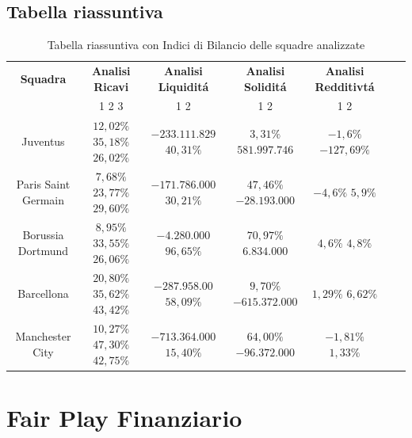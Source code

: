 \documentclass[
    corpo=12pt,
    oneside,
    evenboxes,
    tipotesi=triennale,
    stile=classica,
    oldstyle,
    autoretitolo,
    greek,
]{toptesi}
\begin{document}
\begin{interlinea}{1.5}
\section{Tabella riassuntiva}
\begin{table}
    \scriptsize
    \caption{Tabella riassuntiva con Indici di Bilancio delle squadre analizzate}
    \label{tabella_riassunto_cap1}
    \begin{tabular}{ccccccc}
        \toprule
        \textbf{Squadra} & \textbf{Analisi Ricavi} & \textbf{Analisi Liquidit\'a} & \textbf{Analisi Solidit\'a} & \textbf{Analisi Redditivt\'a} \\
        \cmidrule{2-5}
        & 1 \hspace{0.7cm} 2 \hspace{0.7cm} 3 & 1 \hspace{0.7cm} 2 & 1 \hspace{0.7cm} 2 & 1 \hspace{0.7cm} 2 \\
        \midrule
        Juventus &  $12,02\%$ $35,18\%$ $26,02\%$ &  $-233.111.829$ $40,31\%$ &  $3,31\%$ $581.997.746$ &  $-1,6\%$ $-127,69\%$ \\[2ex]
        Paris Saint Germain  &  $7,68\%$ $23,77\%$ $29,60\%$ &  $-171.786.000$ $30,21\%$ &  $47,46\%$ $-28.193.000$ &  $-4,6\%$ $5,9\%$ \\[2ex]
        Borussia Dortmund  & $8,95\%$ $33,55\%$ $26,06\%$ &  $-4.280.000$ $96,65\%$ &  $70,97\%$ $6.834.000$ &  $4,6\%$ $4,8\%$ \\[2ex]
        Barcellona &  $20,80\%$ $35,62\%$ $43,42\%$ &  $-287.958.00$ $58,09\%$ &  $9,70\%$ $-615.372.000$ &  $1,29\%$ $6,62\%$ \\[2ex]
        Manchester City &  $10,27\%$ $47,30\%$ $42,75\%$ &  $-713.364.000$ $15,40\%$ &  $64,00\%$ $-96.372.000$ &  $-1,81\%$ $1,33\%$ \\[2ex]
        \bottomrule    
    \end{tabular}
\end{table}

\chapter{Fair Play Finanziario}

\end{interlinea}
\end{document}
